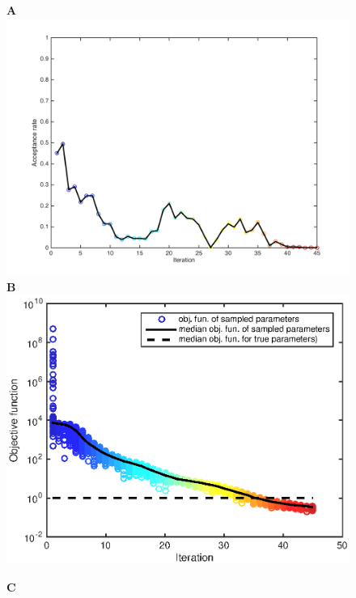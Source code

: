 \documentclass[10pt,letterpaper]{article}
\begin{document}
\begin{figure}[htbp]
\begin{minipage}[t]{0.33\textwidth}
\textbf{A}
\includegraphics[width=\textwidth]{Data/TumorToyData2D_0.001merr_100pop_GCKI67ECM_NEW_acceptanceRate}\\
\textbf{B}
\includegraphics[width=\textwidth]{Data/TumorToyData2D_0.001merr_100pop_GCKI67ECM-objFunc}
\end{minipage}
\begin{minipage}[t]{0.66\textwidth}
\textbf{C}\\

\end{minipage}
\end{figure}
\end{document}
